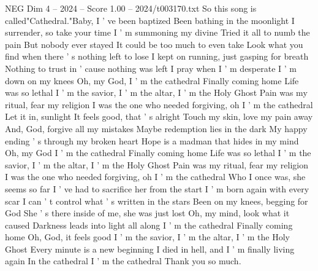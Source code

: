 \begin{textsample}{NEG Dim 4 – 2024 – Score 1.00 – 2024/t003170.txt}
So this song is called"Cathedral."Baby, I ' ve been baptized Been bathing in the moonlight I surrender, so take your time I ' m summoning my divine Tried it all to numb the pain But nobody ever stayed It could be too much to even take Look what you find when there ' s nothing left to lose I kept on running, just gasping for breath Nothing to trust in ' cause nothing was left I pray when I ' m desperate I ' m down on my knees Oh, my God, I ' m the cathedral Finally coming home Life was so lethal I ' m the savior, I ' m the altar, I ' m the Holy Ghost Pain was my ritual, fear my religion I was the one who needed forgiving, oh I ' m the cathedral Let it in, sunlight It feels good, that ' s alright Touch my skin, love my pain away And, God, forgive all my mistakes Maybe redemption lies in the dark My happy ending ' s through my broken heart Hope is a madman that hides in my mind Oh, my God I ' m the cathedral Finally coming home Life was so lethal I ' m the savior, I ' m the altar, I ' m the Holy Ghost Pain was my ritual, fear my religion I was the one who needed forgiving, oh I ' m the cathedral Who I once was, she seems so far I ' ve had to sacrifice her from the start I ' m born again with every scar I can ' t control what ' s written in the stars Been on my knees, begging for God She ' s there inside of me, she was just lost Oh, my mind, look what it caused Darkness leads into light all along I ' m the cathedral Finally coming home Oh, God, it feels good I ' m the savior, I ' m the altar, I ' m the Holy Ghost Every minute is a new beginning I died in hell, and I ' m finally living again In the cathedral I ' m the cathedral Thank you so much.

\end{textsample}
